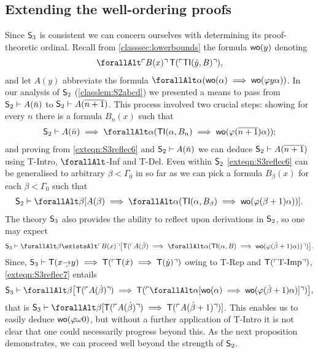 \documentclass[UKenglish,cleveref,DIV=12]{scrartcl}
\let\forall\forallAlt
\let\exists\existsAlt
\theoremstyle{definition}
\theoremstyle{definition}
\begin{document}
\subsection{Extending the well-ordering proofs}
\label{extsec:S3lowerbd}
Since $\mathsf{S}_3$ is consistent we can concern ourselves with
determining its proof-theoretic ordinal.
Recall from \cref{classsec:lowerbounds} the formula $\mathsf{wo}(y)$ denoting
\begin{align*}
  \forall\gn {B(x)}\,\T(\gn{\TI(\dot y,B)}),
\end{align*}
and let $A(y)$ abbreviate the formula
$\forall\alpha(\wo(\alpha)\implies\wo(\varphi y\alpha))$. In our analysis of
$\mathsf{S}_2$ (\cref{classlem:S2abcd}) we presented a means to pass from
$\mathsf{S}_2 \vdash A(\bar n)$ to $\mathsf{S}_2\vdash A(\overline{n+1})$. This process
involved two crucial steps: showing for every $n$ there is a formula
$B_n(x)$ such that
\begin{align}\label{exteqn:S3reflec6}
 \theory S_2\proves A(\bar n)\implies \forall\alpha(\TI(\alpha,B_n)\implies \wo(\varphi(\overline{n+1})\alpha));
\end{align}
and proving from \cref{exteqn:S3reflec6} and $\mathsf{S}_2\vdash A(\bar n)$ we can deduce $\mathsf{S}_2\vdash A(\overline{n+1})$
using T-Intro, $\forall$-Inf and T-Del. Even within $\mathsf{S}_2$ \cref{exteqn:S3reflec6} can be generalised to arbitrary $\beta<\Gamma_0$ in so far as we can pick a formula $B_\beta(x)$ for each $\beta<\Gamma_0$ such that
\begin{align*}
 \theory S_2\proves \forall\beta[A(\beta)\implies \forall\alpha(\TI(\alpha,B_\beta)\implies \wo(\varphi(\beta+1)\alpha))].
\end{align*}
The theory $\mathsf{S}_3$ also provides the ability to reflect upon derivations in $\mathsf{S}_2$, so one may expect
\begin{align}\label{exteqn:S3reflec7}
 \theory S_3\proves \forall\beta\exists\gn{B(x)}\big[\T(\gn{A(\dot \beta)\implies \forall\alpha(\TI(\alpha,B)\implies \wo(\varphi (\dot \beta+1)\alpha))})\big].
\end{align}
Since,  $\theory S_3\proves \T(x\dimplies y)\implies \T(\gn{\T(\dot x)\implies \T(\dot y)})$ owing to T-Rep and $\mathsf{T}(\ulcorner{\text{T-Imp}}\urcorner)$, \cref{exteqn:S3reflec7} entails
\begin{align*}
 \theory S_3\proves \forall\beta\big[\T(\gn{A(\dot \beta)})\implies \T(\gn{\forall\alpha[\wo(\alpha)\implies \wo(\varphi (\dot\beta+1)\alpha)]})\big],
\end{align*}
that is $\theory S_3\proves \forall\beta[\T(\gn{A(\dot \beta)})\implies \T(\gn{A(\dot\beta+1)})]$. This enables us to easily deduce $\mathsf{wo}(\varphi\omega0)$, but without a further application of T-Intro it is not clear that one could necessarily progress beyond this. As the next proposition demonstrates, we can proceed well beyond the strength of $\mathsf{S}_2$.
\end{document}
